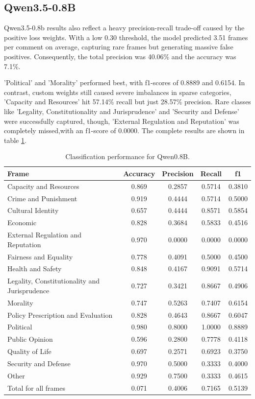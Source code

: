 \documentclass[
10pt, %
a4paper, %
oneside, %
headinclude,footinclude, %
] {book}%
\begin{document}
\subsection{Qwen3.5-0.8B}
Qwen3.5-0.8b results also reflect a heavy precision-recall trade-off caused by the positive loss weights. With a low 0.30 threshold, the model predicted 3.51 frames per comment on average, capturing rare frames but generating massive false positives. Consequently, the total precision was 40.06\% and the accuracy was 7.1\%.

'Political' and 'Morality' performed best, with f1-scores of 0.8889 and 0.6154. In contrast, custom weights still caused severe imbalances in sparse categories, 'Capacity and Resources' hit 57.14\% recall but just 28.57\% precision. Rare classes like 'Legality, Constitutionality and Jurisprudence' and 'Security and Defense' were successfully captured, though, 'External Regulation and Reputation' was completely missed,with an f1-score of 0.0000. The complete results are shown in table \ref{tab:qwen08b_classification}.



\begin{table}[htbp]
\small
\centering
\begin{tabular}{|l|c|c|c|c|}
\hline
\textbf{Frame} & \textbf{Accuracy} & \textbf{Precision} & \textbf{Recall} & \textbf{f1} \\
\hline
Capacity and Resources & 0.869 & 0.2857 & 0.5714 & 0.3810 \\\hline
Crime and Punishment & 0.919 & 0.4444 & 0.5714 & 0.5000 \\\hline
Cultural Identity & 0.657 & 0.4444 & 0.8571 & 0.5854 \\\hline
Economic & 0.828 & 0.3684 & 0.5833 & 0.4516 \\\hline
External Regulation and Reputation & 0.970 & 0.0000 & 0.0000 & 0.0000 \\\hline
Fairness and Equality & 0.778 & 0.4091 & 0.5000 & 0.4500 \\\hline
Health and Safety & 0.848 & 0.4167 & 0.9091 & 0.5714 \\\hline
Legality, Constitutionality and Jurisprudence & 0.727 & 0.3421 & 0.8667 & 0.4906 \\\hline
Morality & 0.747 & 0.5263 & 0.7407 & 0.6154 \\\hline
Policy Prescription and Evaluation & 0.828 & 0.4643 & 0.8667 & 0.6047 \\\hline
Political & 0.980 & 0.8000 & 1.0000 & 0.8889 \\\hline
Public Opinion & 0.596 & 0.2800 & 0.7778 & 0.4118 \\\hline
Quality of Life & 0.697 & 0.2571 & 0.6923 & 0.3750 \\\hline
Security and Defense & 0.970 & 0.5000 & 0.3333 & 0.4000 \\
\hline
Other & 0.929 & 0.7500 & 0.3333 & 0.4615 \\\hline
Total for all frames & 0.071 & 0.4006 & 0.7165 & 0.5139 \\
\hline
\end{tabular}
\caption{Classification performance for Qwen0.8B.}
\label{tab:qwen08b_classification}
\end{table}
\end{document}
